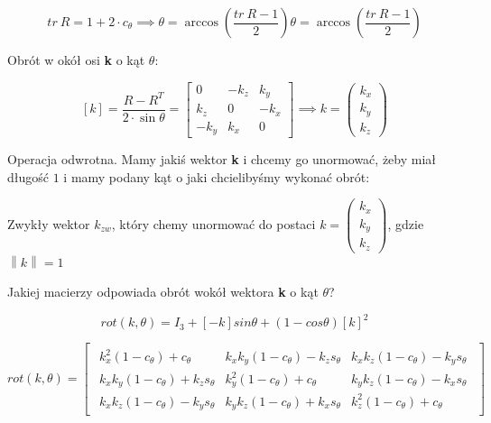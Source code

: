 \documentclass{article}
\newcommand{\norm}[1]{\left\lVert#1\right\rVert}
\begin{document}
\Large
$$
    tr \ R=1+2\cdot c_{\theta} \implies \theta=\arccos\left(\frac{tr \ R-1}{2}\right)
    \theta = \arccos\left(\frac{tr \ R - 1}{2}\right)
$$
\normalsize

Obrót w okół osi {\bf k} o kąt $\theta$:

\Large
$$
    \left[k\right]=\frac{R-R^{T}}{2\cdot\sin\theta}=
    \begin{bmatrix}
        0      & -k_{z} & k_{y}  \\[0.3em]
        k_{z}  & 0      & -k_{x} \\[0.3em]
        -k_{y} & k_{x}  & 0
    \end{bmatrix}
    \implies
    k =
    \begin{pmatrix}
        k_{x} \\
        k_{y} \\
        k_{z}
    \end{pmatrix}
$$
\normalsize

\newpage

Operacja odwrotna.
Mamy jakiś wektor {\bf k} i chcemy go unormować, żeby miał długość $1$ i mamy
podany kąt o jaki chcielibyśmy wykonać obrót:


Zwykły wektor $k_{zw}$, który chemy unormować do postaci $k =
    \begin{pmatrix}
        k_{x} \\
        k_{y} \\
        k_{z}
    \end{pmatrix}$, gdzie $\norm{k}=1$

Jakiej macierzy odpowiada obrót wokół wektora {\bf k} o kąt $\theta$?


\Large
$$
    rot(k, \theta ) = I_{3} + [-k] sin \theta + (1-cos \theta ) [k]^2
$$

$$
    rot(k, \theta)=
    \begin{bmatrix}
        \begin{array}{c|c|c}
            k_{x}^{2}(1-c_{\theta})+c_{\theta}       & k_{x}k_{y}(1-c_{\theta})-k_{z}s_{\theta} & k_{x}k_{z}(1-c_{\theta})-k_{y}s_{\theta} \\[0.3em]
            \hline
            k_{x}k_{y}(1-c_{\theta})+k_{z}s_{\theta} & k_{y}^{2}(1-c_{\theta})+c_{\theta}       & k_{y}k_{z}(1-c_{\theta})-k_{x}s_{\theta} \\[0.3em]
            \hline
            k_{x}k_{z}(1-c_{\theta})-k_{y}s_{\theta} & k_{y}k_{z}(1-c_{\theta})+k_{x}s_{\theta} & k_{z}^{2}(1-c_{\theta})+c_{\theta}
        \end{array}
    \end{bmatrix}
$$
\normalsize
\end{document}
